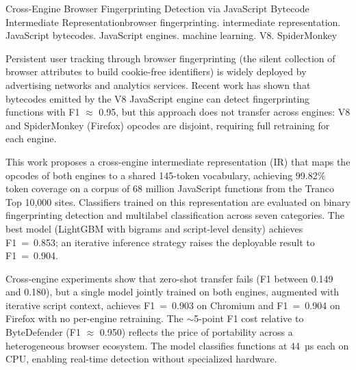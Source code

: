 \begin{englishabstract}{Cross-Engine Browser Fingerprinting Detection via JavaScript Bytecode Intermediate Representation}{browser fingerprinting. intermediate representation. JavaScript bytecodes. JavaScript engines. machine learning. V8. SpiderMonkey}

Persistent user tracking through browser fingerprinting (the silent collection
of browser attributes to build cookie-free identifiers) is widely deployed by
advertising networks and analytics services. Recent work has shown that bytecodes
emitted by the V8 JavaScript engine can detect fingerprinting functions with
F1 $\approx$ 0.95, but this approach does not transfer across engines: V8 and
SpiderMonkey (Firefox) opcodes are disjoint, requiring full retraining for each
engine.

This work proposes a cross-engine intermediate representation (IR) that maps the
opcodes of both engines to a shared 145-token vocabulary, achieving 99.82\% token
coverage on a corpus of 68 million JavaScript functions from the Tranco Top 10,000
sites. Classifiers trained on this representation are evaluated on binary
fingerprinting detection and multilabel classification across seven categories. The
best model (LightGBM with bigrams and script-level density) achieves
F1~=~0.853; an iterative inference strategy raises the deployable result to
F1~=~0.904.

Cross-engine experiments show that zero-shot transfer fails (F1 between 0.149 and 0.180),
but a single model jointly trained on both engines, augmented with iterative script
context, achieves F1~=~0.903 on Chromium and F1~=~0.904 on Firefox with no
per-engine retraining. The $\sim$5-point F1 cost
relative to ByteDefender (F1 $\approx$ 0.950) reflects the price of portability
across a heterogeneous browser ecosystem. The model classifies functions at
44~µs each on CPU, enabling real-time detection without specialized hardware.

\end{englishabstract}
